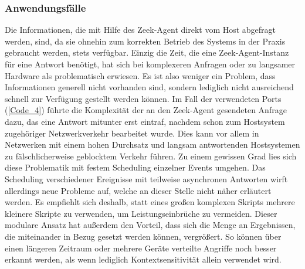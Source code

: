 \subsubsection{Anwendungsfälle}
Die Informationen, die mit Hilfe des Zeek-Agent direkt vom Host abgefragt werden, sind, da sie ohnehin zum korrekten Betrieb des Systems in der Praxis gebraucht werden, stets verfügbar. Einzig die Zeit, die eine Zeek-Agent-Instanz für eine Antwort benötigt, hat sich bei komplexeren Anfragen oder zu langsamer Hardware als problematisch erwiesen. Es ist also weniger ein Problem, dass Informationen generell nicht vorhanden sind, sondern lediglich nicht ausreichend schnell zur Verfügung gestellt werden können. Im Fall der verwendeten Ports (\ref{Code_4}) führte die Komplexität der an den Zeek-Agent gesendeten Anfrage dazu, das eine Antwort mitunter erst eintraf, nachdem schon zum Hostsystem zugehöriger Netzwerkverkehr bearbeitet wurde. Dies kann vor allem in Netzwerken mit einem hohen Durchsatz und langsam antwortenden Hostsystemen zu fälschlicherweise geblocktem Verkehr führen. Zu einem gewissen Grad lies sich diese Problematik mit festem Scheduling einzelner Events umgehen. Das Scheduling verschiedener Ereignisse mit teilweise asynchronen Antworten wirft allerdings neue Probleme auf, welche an dieser Stelle nicht näher erläutert werden. Es empfiehlt sich deshalb, statt eines großen komplexen Skripts mehrere kleinere Skripte zu verwenden, um Leistungseinbrüche zu vermeiden. Dieser modulare Ansatz hat außerdem den Vorteil, dass sich die Menge an Ergebnissen, die miteinander in Bezug gesetzt werden können, vergrößert. So können über einen längeren Zeitraum oder mehrere Geräte verteilte Angriffe noch besser erkannt werden, als wenn lediglich Kontextsensitivität allein verwendet wird.
